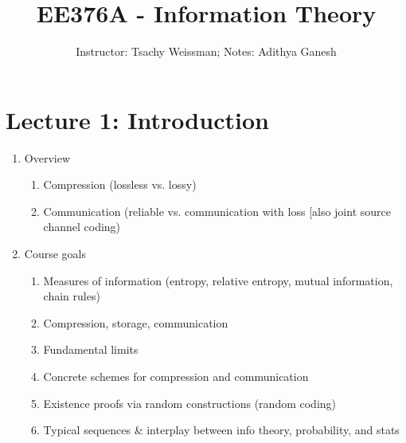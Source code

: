\documentclass[13pt]{article}
\title{EE376A - Information Theory}
\author{Instructor: Tsachy Weissman; Notes: Adithya Ganesh}
\begin{document}
\maketitle

\tableofcontents

\section{Lecture 1: Introduction}
\begin{enumerate}
  \item Overview
    \begin{enumerate}
      \item Compression (lossless vs. lossy)
      \item Communication (reliable vs. communication with loss [also joint source channel coding)
    \end{enumerate}
  \item Course goals
    \begin{enumerate}
      \item Measures of information (entropy, relative entropy, mutual information, chain rules)
      \item Compression, storage, communication
      \item Fundamental limits
      \item Concrete schemes for compression and communication
      \item Existence proofs via random constructions (random coding)
      \item Typical sequences & interplay between info theory, probability, and stats
    \end{enumerate}

\end{enumerate}
\end{document}
